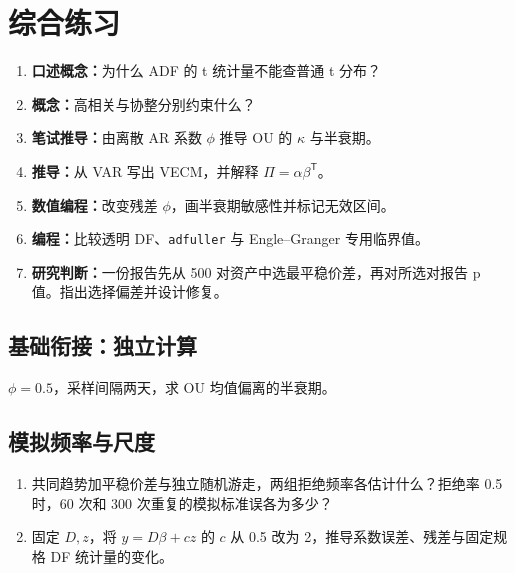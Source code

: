 \section{综合练习}
\begin{enumerate}[leftmargin=*]
  \item \textbf{口述概念：}为什么 ADF 的 t 统计量不能查普通 t 分布？
  \item \textbf{概念：}高相关与协整分别约束什么？
  \item \textbf{笔试推导：}由离散 AR 系数 $\phi$ 推导 OU 的 $\kappa$ 与半衰期。
  \item \textbf{推导：}从 VAR 写出 VECM，并解释 $\Pi=\alpha\beta^{\mathsf T}$。
  \item \textbf{数值编程：}改变残差 $\phi$，画半衰期敏感性并标记无效区间。
  \item \textbf{编程：}比较透明 DF、\texttt{adfuller} 与 Engle--Granger 专用临界值。
  \item \textbf{研究判断：}一份报告先从 500 对资产中选最平稳价差，再对所选对报告 p 值。指出选择偏差并设计修复。
\end{enumerate}

\subsection*{基础衔接：独立计算}
$\phi=0.5$，采样间隔两天，求 OU 均值偏离的半衰期。

\subsection*{模拟频率与尺度}
\begin{enumerate}[leftmargin=*]
\item 共同趋势加平稳价差与独立随机游走，两组拒绝频率各估计什么？拒绝率 0.5 时，60 次和 300 次重复的模拟标准误各为多少？
\item 固定 $D,z$，将 $y=D\beta+cz$ 的 $c$ 从 0.5 改为 2，推导系数误差、残差与固定规格 DF 统计量的变化。
\end{enumerate}
